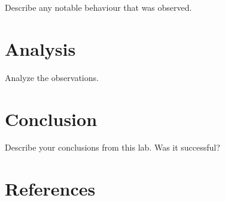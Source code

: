 \documentclass[12pt]{article}
\begin{document}
Describe any notable behaviour that was observed.
\nocite{LOGISIM}

\section{Analysis}

Analyze the observations.

\section{Conclusion}

Describe your conclusions from this lab.
Was it successful?

\clearpage

\pagebreak
\renewcommand*{\refname}{}
\section{References}
%
%


\end{document}
